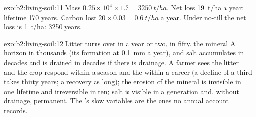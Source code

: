 \begin{solution}{exo:b2:living-soil:11}
Mass $0.25\times 10^{4}\times 1.3 = \qty{3250}{t/ha}$. Net loss
\qty{19}{t/ha} a year: lifetime 170 years. Carbon lost $20\times
0.03 = \qty{0.6}{t/ha}$ a year. Under no-till the net loss is
\qty{1}{t/ha}: 3250 years.
\end{solution}

\begin{solution}{exo:b2:living-soil:12}
Litter turns over in a year or two,  in fifty, the mineral A
horizon in thousands (its formation at \qty{0.1}{mm} a year), and
salt accumulates in decades and is drained in decades if there is
drainage. A farmer sees the litter and the crop respond within a
season and the  within a career (a decline of a third takes
thirty years; a recovery as long); the erosion of the mineral 
is invisible in one lifetime and irreversible in ten; salt is
visible in a generation and, without drainage, permanent. The
's slow variables are the ones no annual account records.
\end{solution}

